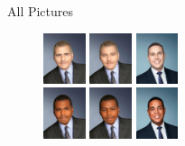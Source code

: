 \documentclass[10pt]{beamer}
\begin{document}
{
\begin{frame}{All Pictures}
\label{all_pic}
\begin{adjustwidth}
\vspace{-1.5cm}
\hfill \hyperlink{pic examples}{}
\vspace{-1cm}
\begin{figure}[h!]
\centering
\hspace{0.485\textwidth}
\includegraphics[width=0.11\textwidth]{img/pic/whitakerBLUE-WM-221.jpg}\hspace{0.1em}
\includegraphics[width=0.11\textwidth]{img/pic/whitakerBLUE-WM-214.jpg}\hspace{0.1em}
\includegraphics[width=0.11\textwidth]{img/pic/lemon-WM-241.jpg}
\\ 
\centering
\hspace{0.485\textwidth}
\includegraphics[width=0.11\textwidth]{img/pic/whitakerBLUE-BM-206.jpg}\hspace{0.1em}
\includegraphics[width=0.11\textwidth]{img/pic/whitakerBLUE-BM-251.jpg}\hspace{0.1em}
\includegraphics[width=0.11\textwidth]{img/pic/lemon-BM-204.jpg}\hfill

\end{figure}
\end{adjustwidth}
\end{frame}}
\end{document}
